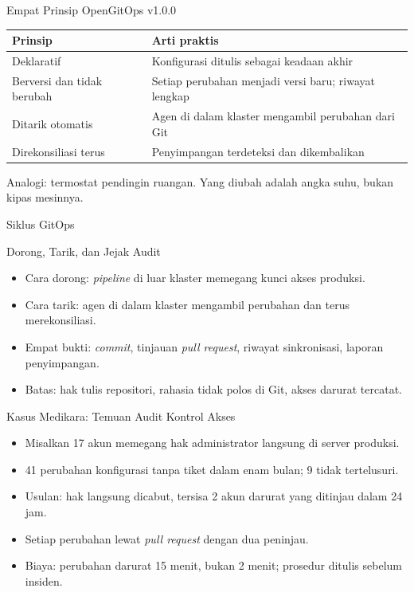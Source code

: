 \documentclass[aspectratio=169, table, 12pt]{beamer}
\begin{document}
\begin{frame}{{\Large Empat Prinsip OpenGitOps v1.0.0}}
  \footnotesize
  \begin{tabularx}{\textwidth}{>{\raggedright\arraybackslash}p{3.8cm}
      >{\raggedright\arraybackslash}X}
    \hline
    \textbf{Prinsip} & \textbf{Arti praktis} \\
    \hline
    Deklaratif & Konfigurasi ditulis sebagai keadaan akhir \\
    \hline
    Berversi dan tidak berubah & Setiap perubahan menjadi versi baru; riwayat lengkap \\
    \hline
    Ditarik otomatis & Agen di dalam klaster mengambil perubahan dari Git \\
    \hline
    Direkonsiliasi terus & Penyimpangan terdeteksi dan dikembalikan \\
    \hline
  \end{tabularx}

  \vspace{8pt}
  \small Analogi: termostat pendingin ruangan. Yang diubah adalah angka suhu, bukan kipas
  mesinnya.
\end{frame}

\begin{frame}{{\Large Siklus GitOps}}
  \centering
\end{frame}

\begin{frame}{{\Large Dorong, Tarik, dan Jejak Audit}}
  \vspace{10pt}
  \begin{itemize}
    \item Cara dorong: \textit{pipeline} di luar klaster memegang kunci akses produksi.
    \item Cara tarik: agen di dalam klaster mengambil perubahan dan terus merekonsiliasi.
    \item Empat bukti: \textit{commit}, tinjauan \textit{pull request}, riwayat sinkronisasi,
          laporan penyimpangan.
    \item Batas: hak tulis repositori, rahasia tidak polos di Git, akses darurat tercatat.
  \end{itemize}
\end{frame}

\begin{frame}{{\Large Kasus Medikara: Temuan Audit Kontrol Akses}}
  \vspace{10pt}
  \begin{itemize}
    \item Misalkan 17 akun memegang hak administrator langsung di server produksi.
    \item 41 perubahan konfigurasi tanpa tiket dalam enam bulan; 9 tidak tertelusuri.
    \item Usulan: hak langsung dicabut, tersisa 2 akun darurat yang ditinjau dalam 24 jam.
    \item Setiap perubahan lewat \textit{pull request} dengan dua peninjau.
    \item Biaya: perubahan darurat 15 menit, bukan 2 menit; prosedur ditulis sebelum insiden.
  \end{itemize}
\end{frame}
\end{document}
